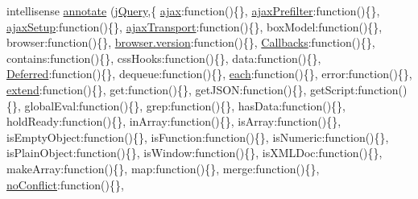 \begin{DoxyCompactItemize}
intellisense \hyperlink{jquery-1_810_82_8intellisense_8js_ad1527630d45bb696c9bc5e21e4bd7355}{annotate} (\hyperlink{_scripts_2jquery-1_810_82_8js_a41c2e1bff4a6b292938143764e31d789}{j\+Query},\{ \textquotesingle{}\hyperlink{_scripts_2jquery_8validate_8js_a77004c0fdc08a5bc07afa0b099cdf6df}{ajax}\textquotesingle{}\+:function()\{\}, \textquotesingle{}\hyperlink{_scripts_2jquery-1_810_82_8js_a144939e373cc1ad511a53c4251ec7ffa}{ajax\+Prefilter}\textquotesingle{}\+:function()\{\}, \textquotesingle{}\hyperlink{_scripts_2jquery-1_810_82_8js_a52a40924d02e0d9756f051e36a640cd6}{ajax\+Setup}\textquotesingle{}\+:function()\{\}, \textquotesingle{}\hyperlink{_scripts_2jquery-1_810_82_8js_ade7f5e1842214b9c2ed0c201344a110c}{ajax\+Transport}\textquotesingle{}\+:function()\{\}, \textquotesingle{}box\+Model\textquotesingle{}\+:function()\{\}, \textquotesingle{}browser\textquotesingle{}\+:function()\{\}, \textquotesingle{}\hyperlink{_scripts_2dropzone_8js_a3a218c507387294cdac43206ee1cd099}{browser.\+version}\textquotesingle{}\+:function()\{\}, \textquotesingle{}\hyperlink{jquery-1_810_82_8intellisense_8js_add8d59d25831bb9b171fdbee8a18795b}{Callbacks}\textquotesingle{}\+:function()\{\}, \textquotesingle{}contains\textquotesingle{}\+:function()\{\}, \textquotesingle{}css\+Hooks\textquotesingle{}\+:function()\{\}, \textquotesingle{}data\textquotesingle{}\+:function()\{\}, \textquotesingle{}\hyperlink{jquery-1_810_82_8intellisense_8js_ab355ffd82371d88c17da7c1dae9e8829}{Deferred}\textquotesingle{}\+:function()\{\}, \textquotesingle{}dequeue\textquotesingle{}\+:function()\{\}, \textquotesingle{}\hyperlink{_scripts_2jquery-1_810_82_8min_8js_af24c9ea1e34372f8c8b312b35586008d}{each}\textquotesingle{}\+:function()\{\}, \textquotesingle{}error\textquotesingle{}\+:function()\{\}, \textquotesingle{}\hyperlink{_scripts_2jquery_8validate_8js_af5783aaf51391a5134949cfee0f54666}{extend}\textquotesingle{}\+:function()\{\}, \textquotesingle{}get\textquotesingle{}\+:function()\{\}, \textquotesingle{}get\+J\+S\+O\+N\textquotesingle{}\+:function()\{\}, \textquotesingle{}get\+Script\textquotesingle{}\+:function()\{\}, \textquotesingle{}global\+Eval\textquotesingle{}\+:function()\{\}, \textquotesingle{}grep\textquotesingle{}\+:function()\{\}, \textquotesingle{}has\+Data\textquotesingle{}\+:function()\{\}, \textquotesingle{}hold\+Ready\textquotesingle{}\+:function()\{\}, \textquotesingle{}in\+Array\textquotesingle{}\+:function()\{\}, \textquotesingle{}is\+Array\textquotesingle{}\+:function()\{\}, \textquotesingle{}is\+Empty\+Object\textquotesingle{}\+:function()\{\}, \textquotesingle{}is\+Function\textquotesingle{}\+:function()\{\}, \textquotesingle{}is\+Numeric\textquotesingle{}\+:function()\{\}, \textquotesingle{}is\+Plain\+Object\textquotesingle{}\+:function()\{\}, \textquotesingle{}is\+Window\textquotesingle{}\+:function()\{\}, \textquotesingle{}is\+X\+M\+L\+Doc\textquotesingle{}\+:function()\{\}, \textquotesingle{}make\+Array\textquotesingle{}\+:function()\{\}, \textquotesingle{}map\textquotesingle{}\+:function()\{\}, \textquotesingle{}merge\textquotesingle{}\+:function()\{\}, \textquotesingle{}\hyperlink{_scripts_2bootstrap_8min_8js_ac26971afe341e4079ee34fceab395fc2}{no\+Conflict}\textquotesingle{}\+:function()\{\}, 
\end{DoxyCompactItemize}
